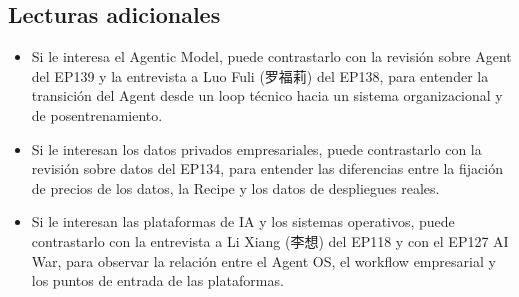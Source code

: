 \subsection{Lecturas adicionales}

\begin{itemize}
\item Si le interesa el Agentic Model, puede contrastarlo con la revisión sobre Agent del EP139 y la entrevista a Luo Fuli (罗福莉) del EP138, para entender la transición del Agent desde un loop técnico hacia un sistema organizacional y de posentrenamiento.
\item Si le interesan los datos privados empresariales, puede contrastarlo con la revisión sobre datos del EP134, para entender las diferencias entre la fijación de precios de los datos, la Recipe y los datos de despliegues reales.
\item Si le interesan las plataformas de IA y los sistemas operativos, puede contrastarlo con la entrevista a Li Xiang (李想) del EP118 y con el EP127 AI War, para observar la relación entre el Agent OS, el workflow empresarial y los puntos de entrada de las plataformas.
\end{itemize}


